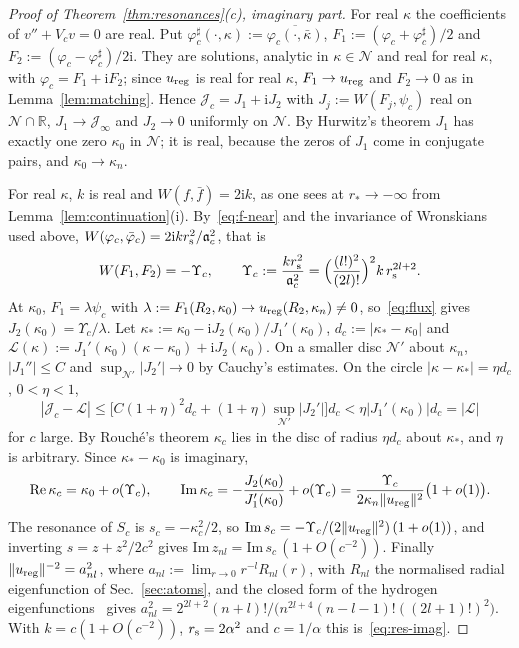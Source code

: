 \documentclass[%
 aip,
 jmp,
 amsmath,amssymb,
 reprint, onecolumn
]{revtex4-1}
\theoremstyle{definition}
\theoremstyle{remark}
\newcommand{\R}{\mathbb{R}}
\newcommand{\rmi}{\mathrm{i}}
\begin{document}
\begin{proof}[Proof of Theorem~\ref{thm:resonances}(c), imaginary part]
For real $\kappa$ the coefficients of $v''+V_cv=0$ are real. Put
$\varphi_c^\sharp(\cdot,\kappa):=\overline{\varphi_c(\cdot,\bar\kappa)}$,
$F_1:=(\varphi_c+\varphi_c^\sharp)/2$ and
$F_2:=(\varphi_c-\varphi_c^\sharp)/2\rmi$. They are solutions, analytic
in $\kappa\in\mathcal N$ and real for real $\kappa$, with $\varphi_c=F_1+\rmi
F_2$; since $u_{\rm reg}$ is real for real $\kappa$, $F_1\to u_{\rm reg}$
and $F_2\to0$ as in Lemma~\ref{lem:matching}. Hence $\mathcal J_c=J_1+\rmi J_2$
with $J_j:=W(F_j,\psi_c)$ real on $\mathcal N\cap\R$, $J_1\to \mathcal J_\infty$ and
$J_2\to0$ uniformly on $\mathcal N$. By Hurwitz's theorem $J_1$ has exactly one
zero $\kappa_0$ in $\mathcal N$; it is real, because the zeros of $J_1$ come in
conjugate pairs, and $\kappa_0\to\kappa_n$.

For real $\kappa$, $k$ is real and $W(f,\bar f)=2\rmi k$, as one sees at
$r_*\to-\infty$ from Lemma~\ref{lem:continuation}(i). By~\eqref{eq:f-near}
and the invariance of Wronskians used above,
$W(\varphi_c,\bar\varphi_c)=2\rmi kr_{\rm s}^2/\mathfrak a_c^2$, that is
\begin{equation}\label{eq:flux}
W(F_1,F_2)=-\Upsilon_c,\qquad
\Upsilon_c:=\frac{kr_{\rm s}^2}{\mathfrak a_c^2}=\Bigl(\frac{(l!)^2}{(2l)!}
\Bigr)^2k\,r_{\rm s}^{2l+2} .
\end{equation}
At $\kappa_0$, $F_1=\lambda\psi_c$ with
$\lambda:=F_1(R_2,\kappa_0)\to u_{\rm reg}(R_2,\kappa_n)\neq0$,
so~\eqref{eq:flux} gives $J_2(\kappa_0)=\Upsilon_c/\lambda$. Let
$\kappa_*:=\kappa_0-\rmi J_2(\kappa_0)/J_1'(\kappa_0)$,
$d_c:=|\kappa_*-\kappa_0|$ and
$\mathcal L(\kappa):=J_1'(\kappa_0)(\kappa-\kappa_0)+\rmi J_2(\kappa_0)$. On a
smaller disc $\mathcal N'$ about $\kappa_n$, $|J_1''|\leq C$ and
$\sup_{\mathcal N'}|J_2'|\to0$ by Cauchy's estimates. On the circle
$|\kappa-\kappa_*|=\eta d_c$, $0<\eta<1$,
\[
|\mathcal J_c-\mathcal L|\leq\bigl[C(1+\eta)^2d_c+(1+\eta)\sup_{\mathcal N'}|J_2'|\bigr]d_c
<\eta|J_1'(\kappa_0)|d_c=|\mathcal L|
\]
for $c$ large. By Rouch\'e's theorem $\kappa_c$ lies in the disc of radius
$\eta d_c$ about $\kappa_*$, and $\eta$ is arbitrary. Since
$\kappa_*-\kappa_0$ is imaginary,
\[
\mathrm{Re}\,\kappa_c=\kappa_0+o(\Upsilon_c),\qquad
\mathrm{Im}\,\kappa_c=-\frac{J_2(\kappa_0)}{J_1'(\kappa_0)}+
o(\Upsilon_c)=\frac{\Upsilon_c}{2\kappa_n\|u_{\rm reg}\|^2}
\bigl(1+o(1)\bigr).
\]
The resonance of $S_c$ is $s_c=-\kappa_c^2/2$, so
$\mathrm{Im}\,s_c=-\Upsilon_c/(2\|u_{\rm reg}\|^2)\,(1+o(1))$, and
inverting $s=z+z^2/2c^2$ gives $\mathrm{Im}\,z_{nl}=\mathrm{Im}\,s_c\,
(1+O(c^{-2}))$. Finally $\|u_{\rm reg}\|^{-2}=a_{nl}^2$, where
$a_{nl}:=\lim_{r\to0}r^{-l}R_{nl}(r)$, with $R_{nl}$ the normalised
radial eigenfunction of Sec.~\ref{sec:atoms}, and the closed form of the hydrogen
eigenfunctions~\cite{BetheSalpeter1957} gives $a_{nl}^2=2^{2l+2}(n+l)!/
\bigl(n^{2l+4}(n-l-1)!((2l+1)!)^2\bigr)$. With $k=c(1+O(c^{-2}))$,
$r_{\rm s}=2\alpha^2$ and $c=1/\alpha$ this is~\eqref{eq:res-imag}.
\end{proof}
\end{document}
